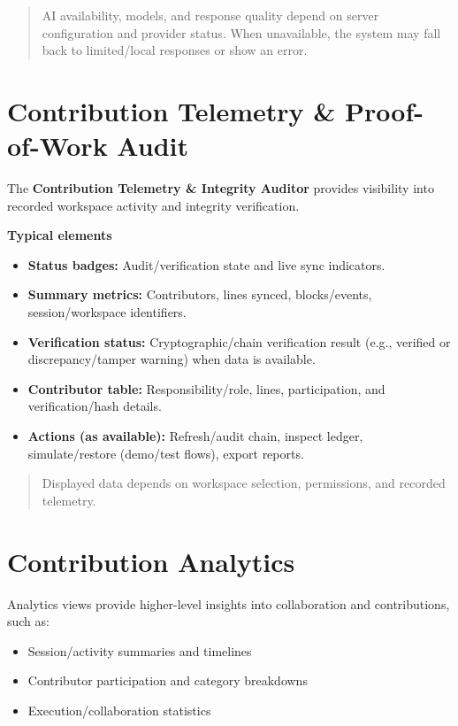 \documentclass[11pt,a4paper]{article}
\begin{document}
\begin{quote}
AI availability, models, and response quality depend on server configuration and provider status. When unavailable, the system may fall back to limited/local responses or show an error.
\end{quote}

\section{Contribution Telemetry \& Proof-of-Work Audit}

The \textbf{Contribution Telemetry \& Integrity Auditor} provides visibility into recorded workspace activity and integrity verification.

\textbf{Typical elements}
\begin{itemize}
  \item \textbf{Status badges:} Audit/verification state and live sync indicators.
  \item \textbf{Summary metrics:} Contributors, lines synced, blocks/events, session/workspace identifiers.
  \item \textbf{Verification status:} Cryptographic/chain verification result (e.g., verified or discrepancy/tamper warning) when data is available.
  \item \textbf{Contributor table:} Responsibility/role, lines, participation, and verification/hash details.
  \item \textbf{Actions (as available):} Refresh/audit chain, inspect ledger, simulate/restore (demo/test flows), export reports.
\end{itemize}

\begin{quote}
Displayed data depends on workspace selection, permissions, and recorded telemetry.
\end{quote}

\section{Contribution Analytics}

Analytics views provide higher-level insights into collaboration and contributions, such as:
\begin{itemize}
  \item Session/activity summaries and timelines
  \item Contributor participation and category breakdowns
  \item Execution/collaboration statistics
\end{itemize}
\end{document}

